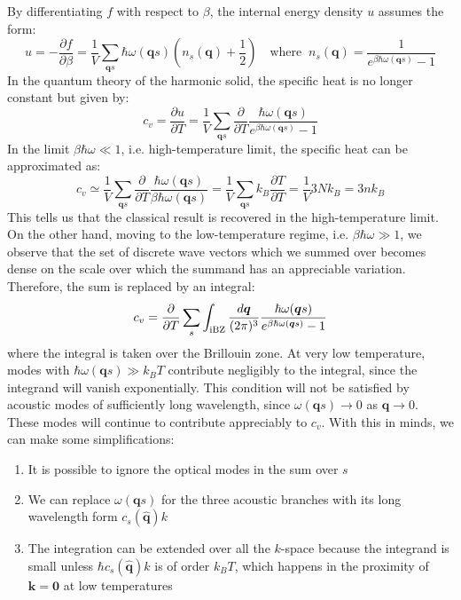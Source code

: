 \documentclass[10.75pt,a4paper,openright,bottom=2cm]{article}
\renewcommand{\Vec}[1]{\boldsymbol{#1}}
\newcommand{\RN}[1]{%
  \textup{\uppercase\expandafter{\romannumeral#1}}%
}
\begin{document}
By differentiating $f$ with respect to $\beta$, the internal energy density $u$ assumes the form:
\[
u=-\frac{\partial f}{\partial\beta}=\frac{1}{V}\sum_{\Vec{q}s}\hbar\omega(\Vec{q}s)\left(n_s(\Vec{q})+\frac{1}{2}\right) \quad \text{where}\;\; n_s(\Vec{q})=\frac{1}{e^{\beta\hbar\omega(\Vec{q}s)}-1}
\]
In the quantum theory of the harmonic solid, the specific heat is no longer constant but given by:
\[
c_v=\frac{\partial u}{\partial T}=\frac{1}{V}\sum_{\Vec{q}s}\frac{\partial}{\partial T}\frac{\hbar\omega(\Vec{q}s)}{e^{\beta\hbar\omega(\Vec{q}s)}-1}
\]
In the limit $\beta\hbar\omega\ll1$, i.e. high-temperature limit, the specific heat can be approximated as:
\[
c_v\simeq\frac{1}{V}\sum_{\Vec{q}s}\frac{\partial}{\partial T}\frac{\hbar\omega(\Vec{q}s)}{\beta\hbar\omega(\Vec{q}s)}=\frac{1}{V}\sum_{\Vec{q}s}k_B\frac{\partial T}{\partial T}=\frac{1}{V}3Nk_B=3nk_B
\]
This tells us that the classical result is recovered in the high-temperature limit. On the other hand, moving to the low-temperature regime, i.e. $\beta\hbar\omega\gg1$, we observe that the set of discrete wave vectors which we summed over becomes dense on the scale over which the summand has an appreciable variation. Therefore, the sum is replaced by an integral:
\begin{equation}
\label{general}
c_v=\frac{\partial}{\partial T}\sum_s\int_{\text{\RN{1}BZ}}\frac{d\Vec{q}}{(2\pi)^3}\frac{\hbar\omega(\Vec{q}s)}{e^{\beta\hbar\omega(\Vec{q}s)}-1}
\end{equation}
where the integral is taken over the  Brillouin zone. At very low temperature, modes with $\hbar\omega(\Vec{q}s)\gg k_BT$ contribute negligibly to the integral, since the integrand will vanish exponentially. This condition will not be satisfied by acoustic modes of sufficiently long wavelength, since $\omega(\Vec{q}s)\to0$ as $\Vec{q}\to0$. These modes will continue to contribute appreciably to $c_v$. With this in minds, we can make some simplifications:
\begin{enumerate}
    \item It is possible to ignore the optical modes in the sum over $s$
    \item We can replace $\omega(\Vec{q}s)$ for the three acoustic branches with its long wavelength form $c_s(\hat{\Vec{q}})k$
    \item The integration can be extended over all the $k$-space because the integrand is small unless $\hbar c_s(\hat{\Vec{q}})k$ is of order $k_BT$, which happens in the proximity of $\Vec{k}=\Vec{0}$ at low temperatures
\end{enumerate}
\end{document}
